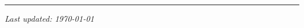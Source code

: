 \documentclass[a4paper, 11pt]{article}
\begin{document}


\medskip
\hrule
\medskip

{\small


\medskip


\medskip


\medskip

\pagebreak


\medskip


\medskip

\pagebreak


\medskip


\medskip


\medskip


\medskip


\medskip


\medskip

%

\pagebreak


\medskip

%

} %

\vfill
{\footnotesize\textit{Last updated: \monthyeardate\today}}
\end{document}

